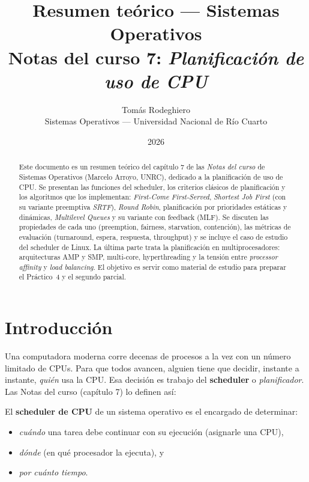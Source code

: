 \documentclass[11pt,a4paper]{article}
\title{
    \vspace{-2.5em}
    \textbf{Resumen teórico --- Sistemas Operativos} \\[0.3em]
    \large Notas del curso 7: \emph{Planificación de uso de CPU}
}
\author{
    Tomás Rodeghiero \\
    \small Sistemas Operativos --- Universidad Nacional de Río Cuarto
}
\date{2026}
\begin{document}
\maketitle

\begin{abstract}
\noindent
Este documento es un resumen teórico del capítulo 7 de las
\emph{Notas del curso} de Sistemas Operativos (Marcelo Arroyo, UNRC),
dedicado a la planificación de uso de CPU. Se presentan las funciones
del scheduler, los criterios clásicos de planificación y los algoritmos
que los implementan: \emph{First-Come First-Served}, \emph{Shortest Job
First} (con su variante preemptiva \emph{SRTF}), \emph{Round Robin},
planificación por prioridades estáticas y dinámicas, \emph{Multilevel
Queues} y su variante con feedback (MLF). Se discuten las propiedades
de cada uno (preemption, fairness, starvation, contención), las
métricas de evaluación (turnaround, espera, respuesta, throughput) y
se incluye el caso de estudio del scheduler de Linux. La última parte
trata la planificación en multiprocesadores: arquitecturas AMP y SMP,
multi-core, hyperthreading y la tensión entre \emph{processor affinity}
y \emph{load balancing}. El objetivo es servir como material de
estudio para preparar el Práctico~4 y el segundo parcial.
\end{abstract}

\tableofcontents
\bigskip

\section{Introducción}

Una computadora moderna corre decenas de procesos a la vez con un
número limitado de CPUs. Para que todos avancen, alguien tiene que
decidir, instante a instante, \emph{quién} usa la CPU. Esa decisión es
trabajo del \textbf{scheduler} o \emph{planificador}. Las Notas del
curso (capítulo 7) lo definen así:

\begin{definicion}
El \textbf{scheduler de CPU} de un sistema operativo es el encargado
de determinar:
\begin{itemize}[leftmargin=*,nosep]
    \item \emph{cuándo} una tarea debe continuar con su ejecución
        (asignarle una CPU),
    \item \emph{dónde} (en qué procesador la ejecuta), y
    \item \emph{por cuánto tiempo}.
\end{itemize}
\end{definicion}
\end{document}
